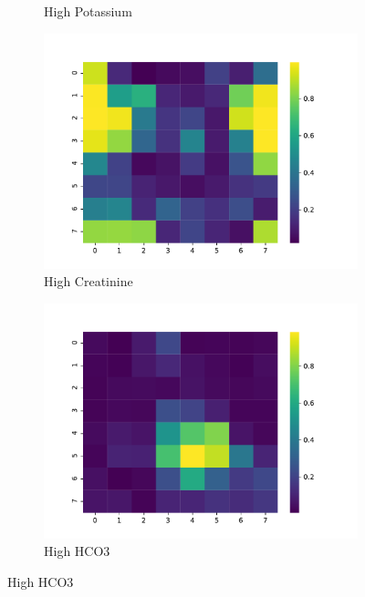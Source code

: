 \begin{figure}[h!]
\begin{subfigure}[t]{0.22\textwidth}
\caption{High Potassium}
\end{subfigure}
\begin{subfigure}[t]{0.22\textwidth}
\centering
\includegraphics[scale=0.22]{./figures/icu_somvaeprob/detail_heatmaps_high_creatinine}
\caption{High Creatinine}
\end{subfigure}
\begin{subfigure}[t]{0.22\textwidth}
\centering
\includegraphics[scale=0.22]{./figures/icu_somvaeprob/detail_heatmaps_high_hco3}
\caption{High HCO3}
\end{subfigure}




\end{figure}
